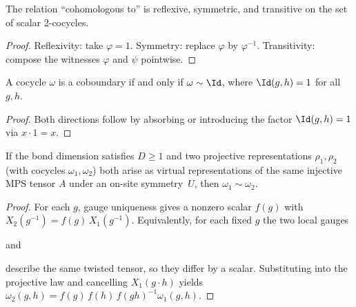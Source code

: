 \begin{theorem}%
    \label{thm:cohomologous_equivalence}
    \leanok
    The relation ``cohomologous to'' is reflexive, symmetric, and
    transitive on the set of scalar 2-cocycles.
\end{theorem}

\begin{proof}\leanok{}
    Reflexivity: take $\varphi = 1$.
    Symmetry: replace $\varphi$ by $\varphi^{-1}$.
    Transitivity: compose the witnesses $\varphi$ and $\psi$ pointwise.
\end{proof}

\begin{lemma}%
    \label{lem:coboundary_iff_cohomologous_one}
    \leanok
    A cocycle $\omega$ is a coboundary if and only if
    $\omega \sim \Id$, where $\Id(g,h) = 1$ for all $g,h$.
\end{lemma}

\begin{proof}\leanok{}
    Both directions follow by absorbing or introducing the factor
    $\Id(g,h) = 1$ via $x\cdot 1 = x$.
\end{proof}

\begin{theorem}%
    \label{thm:cocycle_gauge_independence}
    \leanok
    If the bond dimension satisfies $D \ge 1$ and two projective
    representations $\rho_1,\rho_2$ (with cocycles
    $\omega_1,\omega_2$) both arise as virtual representations of the
    same injective MPS tensor $A$ under an on-site symmetry~$U$, then
    $\omega_1 \sim \omega_2$.
\end{theorem}

\begin{proof}\leanok
    For each $g$, gauge uniqueness gives a nonzero scalar $f(g)$ with
    $X_2(g^{-1}) = f(g)\,X_1(g^{-1})$.
    Equivalently, for each fixed $g$ the two local gauges
    \begin{center}
        \qquad and\qquad
    \end{center}
    describe the same twisted tensor, so they differ by a scalar.
    Substituting into the projective law and cancelling $X_1(g\cdot h)$
    yields
    $\omega_2(g,h) = f(g)\,f(h)\,f(gh)^{-1} \omega_1(g,h)$.
\end{proof}

